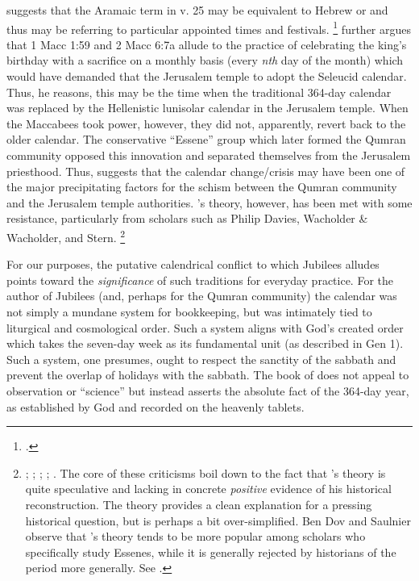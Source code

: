\noindent
\vanderkam suggests that the Aramaic term  in v. 25 may be equivalent to Hebrew  or  and thus may be referring to particular appointed times and festivals.%
    \footnote{\cite[59--60]{vanderkam_jsj1981}.}
\vanderkam further argues that 1 Macc 1:59 and 2 Macc 6:7a allude to the practice of celebrating the king's birthday with a sacrifice on a monthly basis (every \emph{nth} day of the month) which would have demanded that the Jerusalem temple to adopt the Seleucid calendar. Thus, he reasons, this may be the time when the traditional 364-day calendar was replaced by the Hellenistic lunisolar calendar in the Jerusalem temple. When the Maccabees took power, however, they did not, apparently, revert back to the older calendar. The conservative ``Essene'' group which later formed the Qumran community opposed this innovation and separated themselves from the Jerusalem priesthood. Thus, \vanderkam suggests that the calendar change/crisis may have been one of the major precipitating factors for the schism between the Qumran community and the Jerusalem temple authorities.\autocite[52]{vanderkam_jsj1981} \vanderkam's theory, however, has been met with some resistance, particularly from scholars such as Philip Davies, Wacholder \& Wacholder, and Stern.%
    \footnote{%
        \cite{davies_cbq1983};
        \cite{wacholder-wacholder_huca1995};
        \cite{stern_lim-etal2000};
        \cite{stern_zpe2000};
        \cite[29 n. 136]{stern2001}.
        The core of these criticisms boil down to the fact that \vanderkam's theory is quite speculative and lacking in concrete \emph{positive} evidence of his historical reconstruction. The theory provides a clean explanation for a pressing historical question, but is perhaps a bit over-simplified. Ben Dov and Saulnier observe that \vanderkam's theory tends to be more popular among scholars who specifically study Essenes, while it is generally rejected by historians of the \secondtemple period more generally. See \cite[142]{bendov-saulnier_cbr2008}.}

For our purposes, the putative calendrical conflict to which Jubilees alludes points toward the \emph{significance} of such traditions for everyday practice. For the author of Jubilees (and, perhaps for the Qumran community) the calendar was not simply a mundane system for bookkeeping, but was intimately tied to liturgical  and cosmological order. Such a system aligns with God's created order which takes the seven-day week as its fundamental unit (as described in Gen 1). Such a system, one presumes, ought to respect the sanctity of the sabbath and prevent the overlap of holidays with the sabbath. The book of \jub does not appeal to observation or ``science'' but instead asserts the absolute fact of the 364-day year, as established by God and recorded on the heavenly tablets. 

